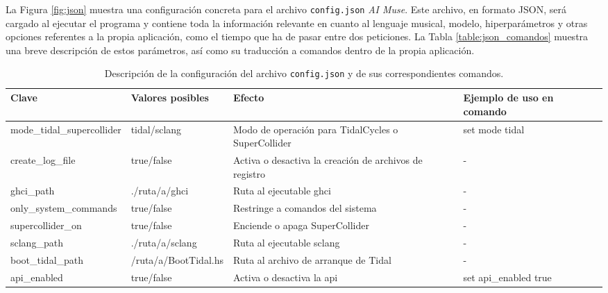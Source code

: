 La Figura \ref{fig:json} muestra una configuración concreta para el archivo \texttt{config.json} \emph{AI Muse}. Este archivo, en formato JSON, será cargado al ejecutar el programa y contiene toda la información relevante en cuanto al lenguaje musical, modelo, hiperparámetros y otras opciones referentes a la propia aplicación, como el tiempo que ha de pasar entre dos peticiones. La Tabla \ref{table:json_comandos} muestra una breve descripción de estos parámetros, así como su traducción a comandos dentro de la propia aplicación.




\begin{table}[htbp]
    \centering
    \caption[Descripción de la configuración del archivo \texttt{config.json} y de sus correspondientes comandos]{Descripción de la configuración del archivo \texttt{config.json} y de sus correspondientes comandos.}
    \label{tab:config-description}
    \fontsize{9.5pt}{11pt}\selectfont
    \begingroup
    \begin{tabularx}{\linewidth}{llXl}
        \toprule
        \rowcolor{azul_unir} %
        \textbf{Clave} & \textbf{Valores posibles} & \textbf{Efecto}& \textbf{Ejemplo de uso en comando} \\
        \midrule
    mode\_tidal\_supercollider & tidal/sclang & Modo de operación para TidalCycles o SuperCollider  & set mode tidal \\
    create\_log\_file & \textcolor{truecolor}{true}/\textcolor{falsecolor}{false} & Activa o desactiva la creación de archivos de registro  & - \\
    ghci\_path & \textcolor{pathcolor}{./ruta/a/ghci} & Ruta al ejecutable ghci  & - \\
    only\_system\_commands & \textcolor{truecolor}{true}/\textcolor{falsecolor}{false} & Restringe a comandos del sistema  & - \\
    supercollider\_on & \textcolor{truecolor}{true}/\textcolor{falsecolor}{false} & Enciende o apaga SuperCollider  & - \\
    sclang\_path & \textcolor{pathcolor}{./ruta/a/sclang} & Ruta al ejecutable sclang  & - \\
    boot\_tidal\_path & \textcolor{pathcolor}{/ruta/a/BootTidal.hs} & Ruta al archivo de arranque de Tidal  & - \\
    api\_enabled & \textcolor{truecolor}{true}/\textcolor{falsecolor}{false} & Activa o desactiva la \gls{api}  & set api\_enabled \textcolor{truecolor}{true} \\

\end{tabularx}
\end{table}
